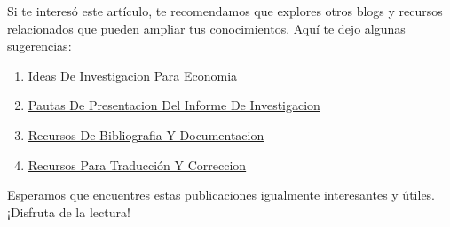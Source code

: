 \documentclass[
  man,
  floatsintext,
  longtable,
  a4paper,
  nolmodern,
  notxfonts,
  notimes,
  colorlinks=true,linkcolor=blue,citecolor=blue,urlcolor=blue]{apa7}
\providecommand{\tightlist}{%
  \setlength{\itemsep}{0pt}\setlength{\parskip}{0pt}}
\begin{document}
Si te interesó este artículo, te recomendamos que explores otros blogs y
recursos relacionados que pueden ampliar tus conocimientos. Aquí te dejo
algunas sugerencias:

\begin{enumerate}
\def\labelenumi{\arabic{enumi}.}
\tightlist
\item
  \href{https://achalmaedison.netlify.app/investigacion-metodologia/posts/2023-06-03-ideas-de-investigacion-para-economia/index.pdf}{}
  \href{https://achalmaedison.netlify.app/investigacion-metodologia/posts/2023-06-03-ideas-de-investigacion-para-economia}{Ideas
  De Investigacion Para Economia}
\item
  \href{https://achalmaedison.netlify.app/investigacion-metodologia/posts/2023-06-03-pautas-de-presentacion-del-informe-de-investigacion/index.pdf}{}
  \href{https://achalmaedison.netlify.app/investigacion-metodologia/posts/2023-06-03-pautas-de-presentacion-del-informe-de-investigacion}{Pautas
  De Presentacion Del Informe De Investigacion}
\item
  \href{https://achalmaedison.netlify.app/investigacion-metodologia/posts/2025-01-12-recursos-de-bibliografia-y-documentacion/index.pdf}{}
  \href{https://achalmaedison.netlify.app/investigacion-metodologia/posts/2025-01-12-recursos-de-bibliografia-y-documentacion}{Recursos
  De Bibliografia Y Documentacion}
\item
  \href{https://achalmaedison.netlify.app/investigacion-metodologia/posts/2025-02-09-recursos-para-traducción-y-correccion/index.pdf}{}
  \href{https://achalmaedison.netlify.app/investigacion-metodologia/posts/2025-02-09-recursos-para-traducción-y-correccion}{Recursos
  Para Traducción Y Correccion}
\end{enumerate}

Esperamos que encuentres estas publicaciones igualmente interesantes y
útiles. ¡Disfruta de la lectura!
\end{document}

